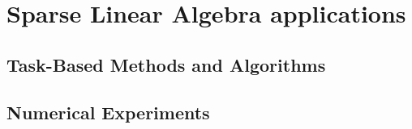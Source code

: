 \chapter{Sparse Linear Algebra applications}

\section{Task-Based Methods and Algorithms}


\section{Numerical Experiments}